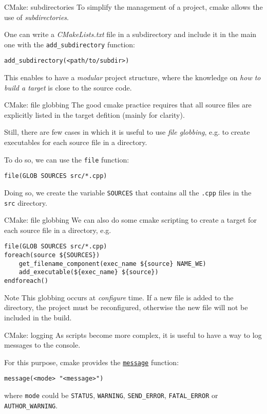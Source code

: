 \begin{frame}[fragile]{CMake: subdirectories}
    To simplify the management of a project, cmake allows the use of \emph{subdirectories}. 

    One can write a \textit{CMakeLists.txt} file in a subdirectory and include it in the main one with the \texttt{add\_subdirectory} function:
\begin{lstlisting}
add_subdirectory(<path/to/subdir>)
\end{lstlisting}
    
    This enables to have a \emph{modular} project structure, where the knowledge on \textit{how to build a target} is close to the source code.
\end{frame}

\begin{frame}[fragile]{CMake: file globbing}
    The good cmake practice requires that all source files are explicitly listed in the target defition (mainly for clarity).

    Still, there are few cases in which it is useful to use \emph{file globbing}, e.g. to create executables for each source file in a directory.

    To do so, we can use the \texttt{file} function:
\begin{lstlisting}
file(GLOB SOURCES src/*.cpp)
\end{lstlisting}
    Doing so, we create the variable \texttt{SOURCES} that contains all the \texttt{.cpp} files in the \texttt{src} directory.
\end{frame}


\begin{frame}[fragile]{CMake: file globbing}
    We can also do some cmake scripting to create a target for each source file in a directory, e.g.
\begin{lstlisting}
file(GLOB SOURCES src/*.cpp)
foreach(source ${SOURCES})
    get_filename_component(exec_name ${source} NAME_WE)
    add_executable(${exec_name} ${source})
endforeach()
\end{lstlisting}
\begin{block}{Note}
    This globbing occurs at \emph{configure} time. 
    If a new file is added to the directory, the project must be reconfigured, otherwise the new file will not be included in the build.
\end{block}
\end{frame}

\begin{frame}[fragile]{CMake: logging}
    As scripts become more complex, it is useful to have a way to log messages to the console. 

    For this purpose, cmake provides the \href{https://cmake.org/cmake/help/latest/command/message.html}{\texttt{message}} function:
\begin{lstlisting}
message(<mode> "<message>")
\end{lstlisting}
where \texttt{mode} could be \texttt{STATUS}, \texttt{WARNING}, \texttt{SEND\_ERROR}, \texttt{FATAL\_ERROR} or \texttt{AUTHOR\_WARNING}.
\end{frame}

